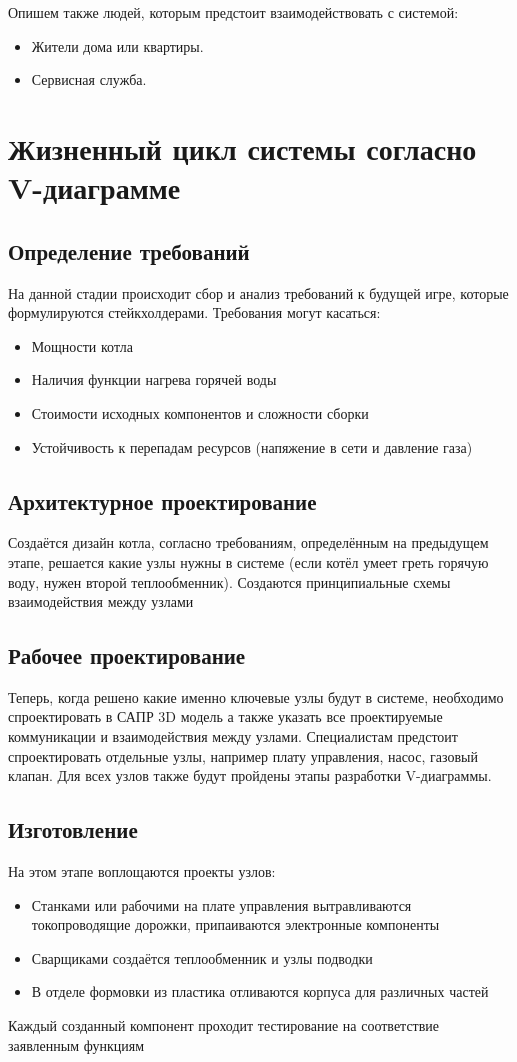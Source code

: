\documentclass[bibliography=totocnumbered]{scrartcl}
\begin{document}
Опишем также людей, которым предстоит взаимодействовать с системой:
\begin{itemize}
    \item Жители дома или квартиры.
    \item Сервисная служба.
\end{itemize}

\section{Жизненный цикл системы согласно V-диаграмме}

\subsection{Определение требований}
На данной стадии происходит сбор и анализ требований к будущей
игре, которые формулируются стейкхолдерами. Требования могут касаться:
\begin{itemize}
    \item Мощности котла
    \item Наличия функции нагрева горячей воды
    \item Стоимости исходных компонентов и сложности сборки
    \item Устойчивость к перепадам ресурсов (напяжение в сети и давление газа)
\end{itemize}

\subsection{Архитектурное проектирование}
Создаётся дизайн котла, согласно требованиям, определённым на предыдущем этапе, решается какие узлы нужны в системе (если котёл умеет греть горячую воду, нужен второй теплообменник). Создаются принципиальные схемы взаимодействия между узлами

\subsection{Рабочее проектирование}
Теперь, когда решено какие именно ключевые узлы будут в системе, необходимо спроектировать в САПР 3D модель а также указать все проектируемые коммуникации и взаимодействия между узлами. Специалистам предстоит спроектировать отдельные узлы, например плату управления, насос, газовый клапан. Для всех узлов также будут пройдены этапы разработки V-диаграммы.

\subsection{Изготовление}
На этом этапе воплощаются проекты узлов:
\begin{itemize}
    \item Станками или рабочими на плате управления вытравливаются токопроводящие дорожки, припаиваются электронные компоненты
    \item Сварщиками создаётся теплообменник и узлы подводки
    \item В отделе формовки из пластика отливаются корпуса для различных частей
\end{itemize}
Каждый созданный компонент проходит тестирование на соответствие заявленным функциям
\end{document}
